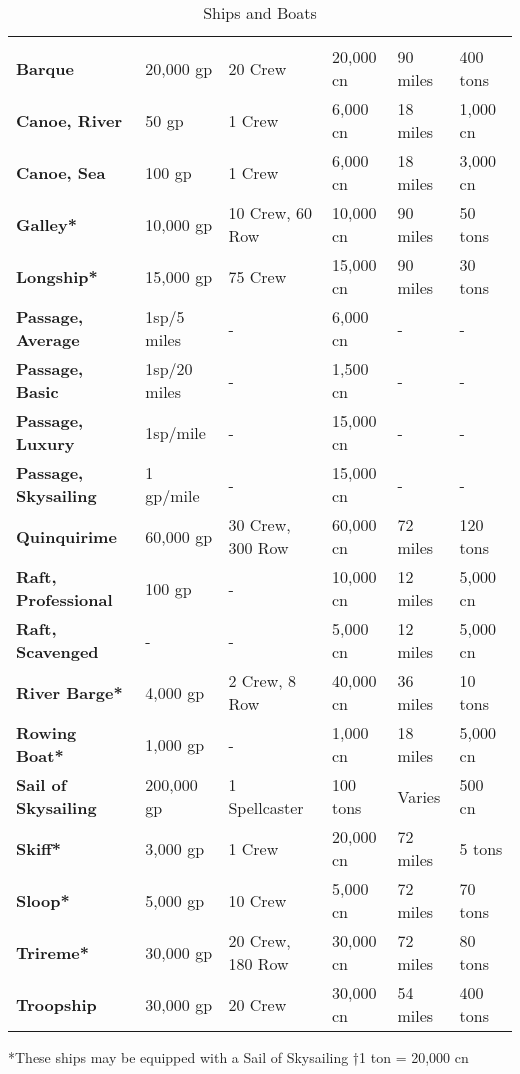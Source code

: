 \begin {table}[H]
  \caption{Ships and Boats}
  \begin{tabularx}{\columnwidth}{>{\bfseries}YYYYYY}
		 &  &  &  &  & \\
		Barque & 20,000 gp & 20 Crew & 20,000 cn & 90 miles & 400 tons\\
		Canoe, River & 50 gp & 1 Crew & 6,000 cn & 18 miles & 1,000 cn\\
		Canoe, Sea & 100 gp & 1 Crew & 6,000 cn & 18 miles & 3,000 cn\\
		Galley* & 10,000 gp & 10 Crew, 60 Row & 10,000 cn & 90 miles & 50 tons\\
		Longship* & 15,000 gp & 75 Crew & 15,000 cn & 90 miles & 30 tons\\
		Passage, Average & 1sp/5 miles & - & 6,000 cn & - & -\\
		Passage, Basic & 1sp/20 miles & - & 1,500 cn & - & -\\
		Passage, Luxury & 1sp/mile & - & 15,000 cn & - & -\\
		Passage, Skysailing & 1 gp/mile & - & 15,000 cn & - & -\\
		Quinquirime & 60,000 gp & 30 Crew, 300 Row & 60,000 cn & 72 miles & 120 tons\\
		Raft, Professional & 100 gp & - & 10,000 cn & 12 miles & 5,000 cn\\
		Raft, Scavenged & - & - & 5,000 cn & 12 miles & 5,000 cn\\
		River Barge* & 4,000 gp & 2 Crew, 8 Row & 40,000 cn & 36 miles & 10 tons\\
		Rowing Boat* & 1,000 gp & - & 1,000 cn & 18 miles & 5,000 cn\\
		Sail of Skysailing & 200,000 gp & 1 Spellcaster & 100 tons & Varies & 500 cn\\
		Skiff* & 3,000 gp & 1 Crew & 20,000 cn & 72 miles & 5 tons\\
		Sloop* & 5,000 gp & 10 Crew & 5,000 cn & 72 miles & 70 tons\\
		Trireme* & 30,000 gp & 20 Crew, 180 Row & 30,000 cn & 72 miles & 80 tons\\
		Troopship & 30,000 gp & 20 Crew & 30,000 cn & 54 miles & 400 tons\
  \end {tabularx}
	*These ships may be equipped with a Sail of Skysailing
	†1 ton = 20,000 cn
\end {table}
